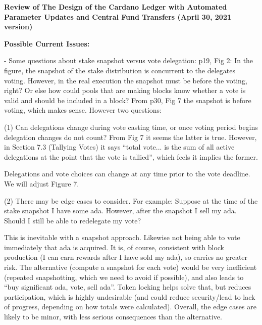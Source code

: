 


\textbf{Review of The Design of the Cardano Ledger with Automated Parameter Updates 
and Central Fund Transfers (April 30, 2021 version)}

\vspace{12pt}
\begin{center}
\textbf{Possible Current Issues: }
\end{center}

\vspace{12pt}
\baselineskip=12pt
\leftskip=0pt
- Some questions about stake snapshot versus vote delegation: p19, Fig 2: In the 
figure, the snapshot of the stake distribution is concurrent to the delegates voting. 
However, in the real execution the snapshot must be before the voting, right? Or 
else how could pools that are making blocks know whether a vote is valid and should 
be included in a block? From p30, Fig 7 the snapshot is before voting, which makes 
sense. However two questions:

\parindent=18pt
(1) Can delegations change during vote casting time, or once voting period begins 
delegation changes do not count? From Fig 7 it seems the latter is true. However, 
in Section 7.3 (Tallying Votes) it says ``total vote... is the sum of all active 
delegations at the point that the vote is tallied'', which feels it implies the 
former.

\vspace{12pt}
\parindent=0pt
{\color{color02} Delegations and vote choices can change at any time prior to the 
vote deadline.  We will adjust Figure 7.}

\vspace{12pt}
\parindent=18pt
(2) There may be edge cases to consider. For example: Suppose at the time of the 
stake snapshot I have some ada. However, after the snapshot I sell my ada. Should 
I still be able to redelegate my vote?

\vspace{12pt}
\parindent=0pt
{\color{color03} This is inevitable with a snapshot approach.  Likewise not being 
able to vote immediately that ada is acquired.  It is, of course, consistent with 
block production (I can earn rewards after I have sold my ada), so carries no greater 
risk.  The alternative (compute a snapshot for each vote) would be very inefficient 
(repeated snapshotting, which we need to avoid if possible), and also leads to 
``buy significant ada, vote, sell ada''.  Token locking helps solve that, but reduces 
participation, which is highly undesirable (and could reduce security/lead to lack 
of progress, depending on how totals were calculated).  Overall, the edge cases 
are likely to be minor, with less serious consequences than the alternative.}

